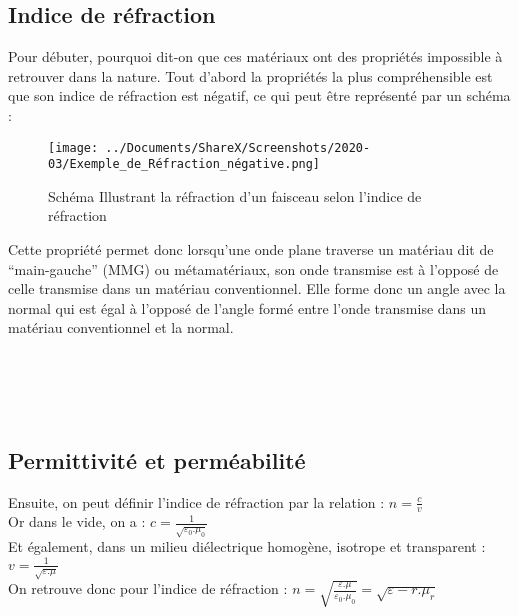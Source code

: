 \documentclass[12pt,a4paper]{article}
\begin{document}
	\subsection{Indice de réfraction}
	Pour débuter, pourquoi dit-on que ces matériaux ont des propriétés impossible à retrouver dans la nature. Tout d’abord la propriétés la plus compréhensible est que son indice de réfraction est négatif, ce qui peut être représenté par un schéma : \\
\begin{wrapfigure}{l}{0.5\textwidth}\centering
 \texttt{[image: ../Documents/ShareX/Screenshots/2020-03/Exemple\_de\_Réfraction\_négative.png]}
 \caption{Schéma Illustrant la réfraction d'un faisceau selon l'indice de réfraction}
\end{wrapfigure}
Cette propriété permet donc lorsqu'une onde plane traverse un matériau dit de “main-gauche” (MMG) ou métamatériaux, son onde transmise est à l’opposé de celle transmise dans un matériau conventionnel. Elle forme donc un angle avec la normal qui est égal à l’opposé de l’angle formé entre l’onde transmise dans un matériau conventionnel et la normal.\cite{Fan2017} \\  \\ \\ \\ \\
	\subsection{Permittivité et perméabilité}
Ensuite, on peut définir l’indice de réfraction par la relation :\hspace{1.0cm} \large \textbf{$n=\frac{c}{v}$} \\

\normalsize Or dans le vide, on a : \hspace{1.0cm} \large \textbf{$c=\frac{1}{\sqrt{\varepsilon_{0} . \mu_{0}}}$} \\
\normalsize Et également, dans un milieu diélectrique homogène, isotrope et transparent : \large \textbf{$v=\frac{1}{\sqrt{\varepsilon . \mu}}$}\\

\normalsize On retrouve donc pour l'indice de réfraction :\hspace{0.5cm} \large \textbf{$n=\sqrt{\frac{\varepsilon . \mu}{\varepsilon_{0} . \mu_{0}}}=\sqrt{\varepsilon-{r} . \mu_{r}}$}\\ \normalsize
\end{document}
